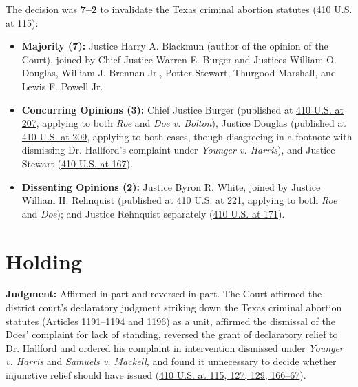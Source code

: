 \documentclass[12pt]{article}
\begin{document}
The decision was \textbf{7--2} to invalidate the Texas criminal abortion statutes (\href{https://supreme.justia.com/cases/federal/us/410/113/}{410 U.S. at 115}):
\begin{itemize}
\item \textbf{Majority (7):} Justice Harry A. Blackmun (author of the opinion of the Court), joined by Chief Justice Warren E. Burger and Justices William O. Douglas, William J. Brennan Jr., Potter Stewart, Thurgood Marshall, and Lewis F. Powell Jr.
\item \textbf{Concurring Opinions (3):} Chief Justice Burger (published at \href{https://supreme.justia.com/cases/federal/us/410/179/}{410 U.S. at 207}, applying to both \textit{Roe} and \textit{Doe v. Bolton}), Justice Douglas (published at \href{https://supreme.justia.com/cases/federal/us/410/179/}{410 U.S. at 209}, applying to both cases, though disagreeing in a footnote with dismissing Dr. Hallford's complaint under \textit{Younger v. Harris}), and Justice Stewart (\href{https://supreme.justia.com/cases/federal/us/410/113/}{410 U.S. at 167}).
\item \textbf{Dissenting Opinions (2):} Justice Byron R. White, joined by Justice William H. Rehnquist (published at \href{https://supreme.justia.com/cases/federal/us/410/179/}{410 U.S. at 221}, applying to both \textit{Roe} and \textit{Doe}); and Justice Rehnquist separately (\href{https://supreme.justia.com/cases/federal/us/410/113/}{410 U.S. at 171}).
\end{itemize}

\section{Holding}

\textbf{Judgment:} Affirmed in part and reversed in part. The Court affirmed the district court's declaratory judgment striking down the Texas criminal abortion statutes (Articles 1191--1194 and 1196) as a unit, affirmed the dismissal of the Does' complaint for lack of standing, reversed the grant of declaratory relief to Dr. Hallford and ordered his complaint in intervention dismissed under \textit{Younger v. Harris} and \textit{Samuels v. Mackell}, and found it unnecessary to decide whether injunctive relief should have issued (\href{https://supreme.justia.com/cases/federal/us/410/113/}{410 U.S. at 115, 127, 129, 166--67}).
\end{document}
